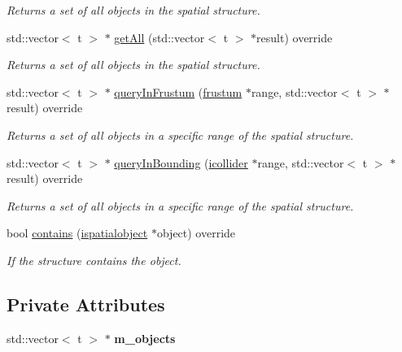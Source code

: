 \begin{DoxyCompactItemize}
\begin{DoxyCompactList}\small\item\em Returns a set of all objects in the spatial structure. \end{DoxyCompactList}\item 
std\+::vector$<$ t $>$ $\ast$ \hyperlink{classflounder_1_1structurebasic_a269fcc272481b2182123523f75afb3f5}{get\+All} (std\+::vector$<$ t $>$ $\ast$result) override
\begin{DoxyCompactList}\small\item\em Returns a set of all objects in the spatial structure. \end{DoxyCompactList}\item 
std\+::vector$<$ t $>$ $\ast$ \hyperlink{classflounder_1_1structurebasic_a33f0b06e49ff40068e90f18773dff9e8}{query\+In\+Frustum} (\hyperlink{classflounder_1_1frustum}{frustum} $\ast$range, std\+::vector$<$ t $>$ $\ast$result) override
\begin{DoxyCompactList}\small\item\em Returns a set of all objects in a specific range of the spatial structure. \end{DoxyCompactList}\item 
std\+::vector$<$ t $>$ $\ast$ \hyperlink{classflounder_1_1structurebasic_a977c80f9e4982f40afc5400714620a31}{query\+In\+Bounding} (\hyperlink{classflounder_1_1icollider}{icollider} $\ast$range, std\+::vector$<$ t $>$ $\ast$result) override
\begin{DoxyCompactList}\small\item\em Returns a set of all objects in a specific range of the spatial structure. \end{DoxyCompactList}\item 
bool \hyperlink{classflounder_1_1structurebasic_ac9a9bcd40d564056c33c2ade540f4e4c}{contains} (\hyperlink{classflounder_1_1ispatialobject}{ispatialobject} $\ast$object) override
\begin{DoxyCompactList}\small\item\em If the structure contains the object. \end{DoxyCompactList}\end{DoxyCompactItemize}
\subsection*{Private Attributes}
\begin{DoxyCompactItemize}
\item 
\mbox{\label{classflounder_1_1structurebasic_abbf50073db6c11fb7e96be76a08f6899}} 
std\+::vector$<$ t $>$ $\ast$ {\bfseries m\+\_\+objects}
\end{DoxyCompactItemize}


